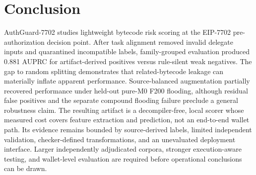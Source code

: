\section{Conclusion}
\label{sec:conclusion}

AuthGuard-7702 studies lightweight bytecode risk scoring at the EIP-7702 pre-authorization decision point. After task alignment removed invalid delegate inputs and quarantined incompatible labels, family-grouped evaluation produced 0.881 AUPRC for artifact-derived positives versus rule-silent weak negatives. The gap to random splitting demonstrates that related-bytecode leakage can materially inflate apparent performance. Source-balanced augmentation partially recovered performance under held-out pure-M0 F200 flooding, although residual false positives and the separate compound flooding failure preclude a general robustness claim. The resulting artifact is a decompiler-free, local scorer whose measured cost covers feature extraction and prediction, not an end-to-end wallet path. Its evidence remains bounded by source-derived labels, limited independent validation, checker-defined transformations, and an unevaluated deployment interface. Larger independently adjudicated corpora, stronger execution-aware testing, and wallet-level evaluation are required before operational conclusions can be drawn.
